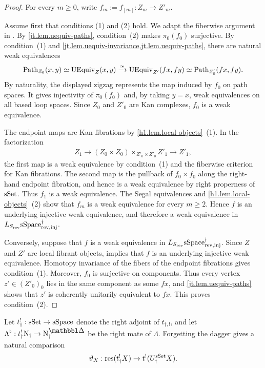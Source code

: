 \documentclass[a4paper,dvipdfmx,11pt]{amsart}
\begin{document}
\begin{proof}
  For every $m\geq0$, write $f_m:=f_{[m]}:Z_m\to Z'_m$.

  Assume first that conditions (1) and (2) hold.
  We adapt the fiberwise argument in \cite[the proof of Proposition~7.6]{Rez01}.
  By \cref{jt.lem.uequiv-paths}, condition~(2) makes $\pi_0(f_0)$ surjective.
  By condition~(1) and \cref{jt.lem.uequiv-invariance,jt.lem.uequiv-paths}, there are natural weak equivalences
  \begin{align}
    \mathrm{Path}_{Z_0}(x,y)
    \simeq
    \mathrm{UEquiv}_Z(x,y)
    \xrightarrow{\simeq}
    \mathrm{UEquiv}_{Z'}(fx,fy)
    \simeq
    \mathrm{Path}_{Z'_0}(fx,fy).
  \end{align}
  By naturality, the displayed zigzag represents the map induced by $f_0$ on path spaces.
  It gives injectivity of $\pi_0(f_0)$ and, by taking $y=x$, weak equivalences on all based loop spaces.
  Since $Z_0$ and $Z'_0$ are Kan complexes, $f_0$ is a weak equivalence.

  The endpoint maps are Kan fibrations by \cref{h1.lem.local-objects}~(1).
  In the factorization
  \begin{align}
    Z_1
    \to
    (Z_0\times Z_0)\times_{Z'_0\times Z'_0}Z'_1
    \to
    Z'_1,
  \end{align}
  the first map is a weak equivalence by condition~(1) and the fiberwise criterion for Kan fibrations.
  The second map is the pullback of $f_0\times f_0$ along the right-hand endpoint fibration, and hence is a weak equivalence by right properness of $\mathrm{sSet}$.
  Thus $f_1$ is a weak equivalence.
  The Segal equivalences and \cref{h1.lem.local-objects}~(2) show that $f_m$ is a weak equivalence for every $m\geq2$.
  Hence $f$ is an underlying injective weak equivalence, and therefore a weak equivalence in $L_{S_{\mathrm{rev}}}\mathrm{sSpace}^{\dag}_{\mathrm{rev},\mathrm{inj}}$.

  Conversely, suppose that $f$ is a weak equivalence in $L_{S_{\mathrm{rev}}}\mathrm{sSpace}^{\dag}_{\mathrm{rev},\mathrm{inj}}$.
  Since $Z$ and $Z'$ are local fibrant objects, \cite[Theorem~3.2.13 (1)]{Hir02} implies that $f$ is an underlying injective weak equivalence.
  Homotopy invariance of the fibers of the endpoint fibrations gives condition~(1).
  Moreover, $f_0$ is surjective on components.
  Thus every vertex $z'\in(Z'_0)_0$ lies in the same component as some $fx$, and
  \cref{jt.lem.uequiv-paths} shows that $z'$ is coherently unitarily equivalent to $fx$.
  This proves condition~(2).
\end{proof}

\begin{notation}\label{jt.not.lambda-mate}
  Let $t_{\dag}^{!} : \mathrm{sSet} \to \mathrm{sSpace}$ denote the right adjoint of $t_{\dag,!}$, and let $\Lambda^{\flat}: t_{\dag}^{!}\N_{\dag} \to \N^{\prism}_{\dag}$ be the right mate of $\Lambda$.
  Forgetting the dagger gives a natural comparison
  \begin{align}\label{jt.eq.tdag-right-underlying}
    \vartheta_X:
    \mathrm{res}(t_{\dag}^{!}X)
    \to
    t^!(U_{\dag}^{\mathrm{sSet}} X).
  \end{align}
\end{notation}
\end{document}
